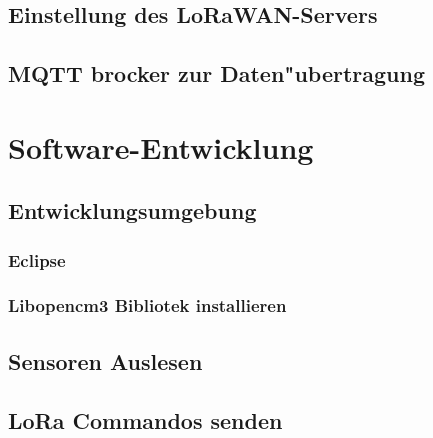 \section{Einstellung des LoRaWAN-Servers}\label{server}
\section{MQTT brocker zur Daten"ubertragung}


\chapter{Software-Entwicklung}\label{Soft-Ent}
\section{Entwicklungsumgebung}
\subsection{Eclipse}
\subsection{Libopencm3 Bibliotek installieren}
\section{Sensoren Auslesen} \label{Sensoren}
\section{LoRa Commandos senden}
